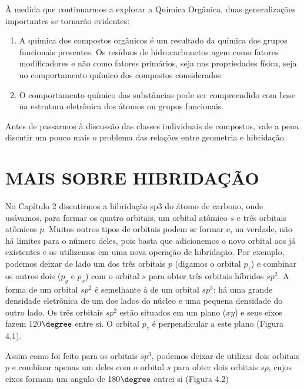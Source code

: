 À medida que continuarmos a explorar a Química Orgânica, duas generalizações importantes se tornarão evidentes:

\begin{enumerate}
    \item A química dos compostos orgânicos é um resultado da química dos grupos funcionais presentes. Os resíduos de hidrocarbonetos agem como fatores modificadores e não como fatores primários, seja nas propriedades física, seja no comportamento químico dos compostos considerados
    \item O comportamento químico das substâncias pode ser compreendido com base na estrutura eletrônica dos átomos ou grupos funcionais.
\end{enumerate}

Antes de passarmos à discussão das classes individuais de compostos, vale a pena discutir um pouco mais o problema das relações entre geometria e hibridação.

\section{MAIS SOBRE HIBRIDAÇÃO}

No Capítulo 2 discutirmos a hibridação sp3 do átomo de carbono, onde usávamos, para formar os quatro orbitais, um orbital atômico $s$ e três orbitais atômicos $p$. Muitos outros tipos de orbitais podem se formar e, na verdade, não há limites para o número deles, pois basta que adicionemos o novo orbital aos já existentes e os utilizemos em uma nova operação de hibridação. Por exemplo, podemos deixar de lado um dos três orbitais $p$ (digamos o orbital $p_z$) e combinar os outros dois ($p_y$ e $p_x$) com o orbital $s$ para obter três orbitais híbridos $sp^2$. A forma de um orbital $sp^2$ é semelhante à de um orbital $sp^3$: há uma grande densidade eletrônica de um dos lados do núcleo e uma pequena densidade do outro lado. Os três orbitais $sp^2$ estão situados em um plano ($xy$) e seus eixos fazem 120$\degree$ entre si. O orbital $p_z$ é perpendicular a este plano (Figura 4.1).

Assim como foi feito para os orbitais $sp^3$, podemos deixar de utilizar dois orbitais $p$ e combinar apenas um deles com o orbital $s$ para obter dois orbitais $sp$, cujos eixos formam um angulo de 180$\degree$ entrei si (Figura 4.2)


